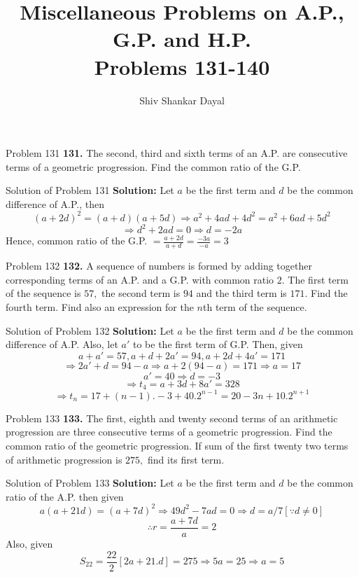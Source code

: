\documentclass[aspectratio=1610,8pt]{beamer}
\title{Miscellaneous Problems on A.P., G.P. and H.P.\\Problems 131-140}
\author[Shiv Shankar Dayal]{Shiv Shankar Dayal}
\begin{document}
\begin{frame}
  \titlepage
\end{frame}
\begin{frame}{Problem 131}
  \textbf{131.} The second, third and sixth terms of an A.P. are consecutive terms of a geometric progression. Find the common
  ratio of the G.P.
\end{frame}
\begin{frame}{Solution of Problem 131}
  \textbf{Solution:} Let $a$ be the first term and $d$ be the common difference of A.P., then
  $$(a + 2d)^2 = (a + d)(a + 5d)\Rightarrow a^2 + 4ad + 4d^2 = a^2 + 6ad + 5d^2$$
  $$\Rightarrow d^2 + 2ad = 0 \Rightarrow d = -2a$$
  Hence, common ratio of the G.P. $= \frac{a + 2d}{a + d} = \frac{-3a}{-a} = 3$
\end{frame}
\begin{frame}{Problem 132}
  \textbf{132.} A sequence of numbers is formed by adding together corresponding terms of an A.P. and a G.P. with common ratio $2.$
  The first term of the sequence is $57,$ the second term is $94$ and the third term is $171.$ Find the fourth term. Find also an
  expression for the $n$th term of the sequence.
\end{frame}
\begin{frame}{Solution of Problem 132}
  \textbf{Solution:} Let $a$ be the first term and $d$ be the common difference of A.P. Also, let $a'$ to be the first term of
  G.P. Then, given
  $$a + a' = 57, a + d + 2a' = 94, a + 2d + 4a' = 171$$
  $$\Rightarrow 2a' + d = 94 - a \Rightarrow a + 2(94 - a) = 171 \Rightarrow a = 17$$
  $$a' = 40 \Rightarrow d = -3$$
  $$\Rightarrow t_4 = a + 3d + 8a' = 328$$
  $$\Rightarrow t_n = 17 + (n - 1).-3 + 40.2^{n - 1} = 20 - 3n + 10.2^{n + 1}$$
\end{frame}
\begin{frame}{Problem 133}
  \textbf{133.} The first, eighth and twenty second terms of an arithmetic progression are three consecutive terms of a geometric
  progression. Find the common ratio of the geometric progression. If sum of the first twenty two terms of arithmetic progression
  is $275,$ find its first term.
\end{frame}
\begin{frame}{Solution of Problem 133}
  \textbf{Solution:} Let $a$ be the first term and $d$ be the common ratio of the A.P. then given
  $$a(a + 21d) = (a + 7d)^2 \Rightarrow 49d^2 - 7ad = 0 \Rightarrow d = a/7[\because d\neq 0]$$
  $$\therefore r = \frac{a + 7d}{a} = 2$$
  Also, given $$S_{22} = \frac{22}{2}[2a + 21.d] = 275 \Rightarrow 5a = 25 \Rightarrow a = 5$$
\end{frame}
\end{document}

